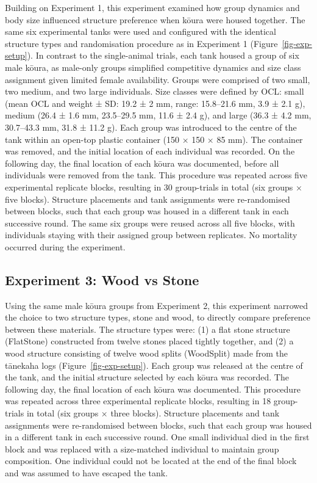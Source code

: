 \documentclass[
  12pt,
  a4paper,
  oneside]{scrbook}
\begin{document}
Building on Experiment 1, this experiment examined how group dynamics
and body size influenced structure preference when kōura were housed
together. The same six experimental tanks were used and configured with
the identical structure types and randomisation procedure as in
Experiment 1 (Figure~\ref{fig-exp-setup}). In contrast to the
single-animal trials, each tank housed a group of six male kōura, as
male-only groups simplified competitive dynamics and size class
assignment given limited female availability. Groups were comprised of
two small, two medium, and two large individuals. Size classes were
defined by OCL: small (mean OCL and weight ± SD: 19.2 ± 2 mm, range:
15.8--21.6 mm, 3.9 ± 2.1 g), medium (26.4 ± 1.6 mm, 23.5--29.5 mm, 11.6
± 2.4 g), and large (36.3 ± 4.2 mm, 30.7--43.3 mm, 31.8 ± 11.2 g). Each
group was introduced to the centre of the tank within an open-top
plastic container (150 × 150 × 85 mm). The container was removed, and
the initial location of each individual was recorded. On the following
day, the final location of each kōura was documented, before all
individuals were removed from the tank. This procedure was repeated
across five experimental replicate blocks, resulting in 30 group-trials
in total (six groups × five blocks). Structure placements and tank
assignments were re-randomised between blocks, such that each group was
housed in a different tank in each successive round. The same six groups
were reused across all five blocks, with individuals staying with their
assigned group between replicates. No mortality occurred during the
experiment.

\subsection{Experiment 3: Wood vs
Stone}\label{experiment-3-wood-vs-stone}

Using the same male kōura groups from Experiment 2, this experiment
narrowed the choice to two structure types, stone and wood, to directly
compare preference between these materials. The structure types were:
(1) a flat stone structure (FlatStone) constructed from twelve stones
placed tightly together, and (2) a wood structure consisting of twelve
wood splits (WoodSplit) made from the tānekaha logs
(Figure~\ref{fig-exp-setup}). Each group was released at the centre of
the tank, and the initial structure selected by each kōura was recorded.
The following day, the final location of each kōura was documented. This
procedure was repeated across three experimental replicate blocks,
resulting in 18 group-trials in total (six groups × three blocks).
Structure placements and tank assignments were re-randomised between
blocks, such that each group was housed in a different tank in each
successive round. One small individual died in the first block and was
replaced with a size-matched individual to maintain group composition.
One individual could not be located at the end of the final block and
was assumed to have escaped the tank.
\end{document}
